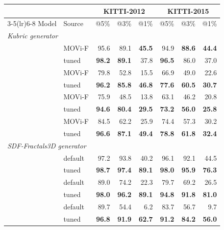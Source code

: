 \begin{tabular}{ll rrrrrr}
\toprule
 &  & \multicolumn{3}{c}{KITTI-2012} & \multicolumn{3}{c}{KITTI-2015} \\
\cmidrule(lr){3-5}\cmidrule(lr){6-8}
Model & Source & @5\% & @3\% & @1\% & @5\% & @3\% & @1\% \\
\midrule
\multicolumn{8}{l}{\emph{Kubric generator}} \\
\addlinespace[1pt]
\multirow{2}{*}{CATs++} & MOVi-F & 95.6 & 89.1 & \textbf{45.5} & 94.9 & \textbf{88.6} & \textbf{44.4} \\
 & tuned & \textbf{98.2} & \textbf{89.1} & 37.8 & \textbf{96.5} & 86.0 & 37.0 \\
\addlinespace[2pt]
\multirow{2}{*}{GLU-Net} & MOVi-F & 79.8 & 52.8 & 15.5 & 66.9 & 49.0 & 22.6 \\
 & tuned & \textbf{96.2} & \textbf{85.8} & \textbf{46.8} & \textbf{77.6} & \textbf{60.5} & \textbf{30.7} \\
\addlinespace[2pt]
\multirow{2}{*}{FlowFormer} & MOVi-F & 75.9 & 48.5 & 13.8 & 63.1 & 46.2 & 20.8 \\
 & tuned & \textbf{94.6} & \textbf{80.4} & \textbf{29.5} & \textbf{73.2} & \textbf{56.0} & \textbf{25.8} \\
\addlinespace[2pt]
\multirow{2}{*}{RAFT} & MOVi-F & 84.5 & 62.2 & 25.9 & 74.4 & 57.3 & 30.2 \\
 & tuned & \textbf{96.6} & \textbf{87.1} & \textbf{49.4} & \textbf{78.8} & \textbf{61.8} & \textbf{32.4} \\
\midrule
\multicolumn{8}{l}{\emph{SDF-Fractals3D generator}} \\
\addlinespace[1pt]
\multirow{2}{*}{CATs++} & default & 97.2 & 93.8 & 40.2 & 96.1 & 92.1 & 44.5 \\
 & tuned & \textbf{98.7} & \textbf{97.4} & \textbf{89.1} & \textbf{98.0} & \textbf{95.9} & \textbf{76.3} \\
\addlinespace[2pt]
\multirow{2}{*}{GLU-Net} & default & 89.0 & 74.2 & 22.3 & 79.7 & 69.2 & 26.5 \\
 & tuned & \textbf{98.0} & \textbf{96.2} & \textbf{89.1} & \textbf{94.8} & \textbf{91.8} & \textbf{81.0} \\
\addlinespace[2pt]
\multirow{2}{*}{FlowFormer} & default & 89.7 & 54.4 & 6.2 & 83.7 & 56.7 & 9.7 \\
 & tuned & \textbf{96.8} & \textbf{91.9} & \textbf{62.7} & \textbf{91.2} & \textbf{84.2} & \textbf{56.0} \\
\bottomrule
\end{tabular}
